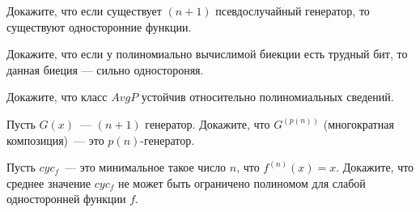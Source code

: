\setcounter{curtask}{35}


\begin{task}
    Докажите, что если существует $(n + 1)$ псевдослучайный генератор, то существуют
    односторонние функции.
\end{task}

\begin{task}
    Докажите, что если у полиномиально вычислимой биекции есть трудный бит, то данная
    биеция --- сильно одностороняя.
\end{task}

\breakline

\begin{ptask}{31}
    Докажите, что класс $AvgP$ устойчив относительно полиномиальных сведений.
\end{ptask}

\begin{ptask}{33}
    Пусть $G(x)$~--- $(n + 1)$ генератор. Докажите, что $G^{(p(n))}$ (многократная
    композиция)~--- это $p(n)$-генератор.
\end{ptask}

\begin{ptask}{34}
    Пусть $cyc_f$~--- это минимальное такое число $n$, что $f^{(n)}(x) = x$. Докажите,
    что среднее значение $cyc_f$ не может быть ограничено полиномом для слабой
    односторонней функции $f$.
\end{ptask}


